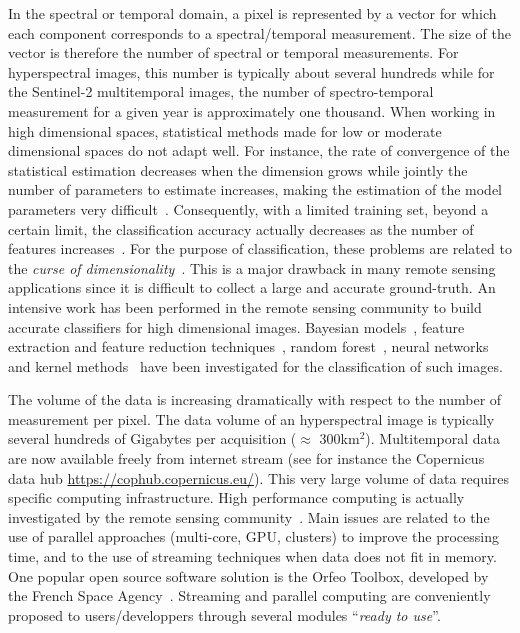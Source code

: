 \documentclass[journal,10pt]{IEEEtran}
\begin{document}
In the spectral or temporal domain, a pixel is represented by a vector
for   which  each   component  corresponds   to  a   spectral/temporal
measurement.   The size  of  the  vector is  therefore  the number  of
spectral  or temporal  measurements.  For  hyperspectral images,  this
number is  typically about several  hundreds while for  the Sentinel-2
multitemporal images, the number of spectro-temporal measurement for a
given  year  is approximately  one  thousand.   When working  in  high
dimensional  spaces,  statistical  methods  made for  low  or  moderate
dimensional  spaces do  not  adapt  well.  For  instance,  the rate  of
convergence of the statistical estimation decreases when the dimension
grows while jointly the number of parameters to estimate increases,
making    the    estimation    of   the    model    parameters    very
difficult~\cite{donoho}.  Consequently,  with a limited  training set,
beyond a certain limit, the classification accuracy actually decreases
as the number of features increases~\cite{hughes}.  For the purpose of
classification,  these  problems are  related  to  the \emph{curse  of
  dimensionality}~\cite{donoho}.  This is  a  major  drawback in  many
remote sensing  applications since it  is difficult to collect  a large
and accurate ground-truth.  An intensive work has been performed in
the remote  sensing community to  build accurate classifiers  for high
dimensional  images.   Bayesian models~\cite{book:landgrebe},  feature
extraction              and             feature              reduction
techniques~\cite{book:landgrebe,DR:guided:tour},                random
forest~\cite{1396322},   neural  networks~\cite{5411821}   and  kernel
methods~\cite{kernel:methods:rs}  have   been  investigated   for  the
classification of such images.

The volume of the data is  increasing dramatically with respect to the
number of measurement  per pixel. The data volume  of an hyperspectral
image  is  typically several  hundreds  of  Gigabytes per  acquisition
($\approx$  300km$^2$). Multitemporal  data are  now available  freely
from  internet  stream  (see  for instance  the  Copernicus  data  hub
\url{https://cophub.copernicus.eu/}).  This very  large volume of data
requires   specific   computing  infrastructure.    High   performance
computing   is   actually   investigated   by   the   remote   sensing
community~\cite{christophe2011remote,plaza2011high}.  Main  issues are
related to the use of parallel approaches (multi-core, GPU, clusters) to
improve the  processing time, and  to the use of  streaming techniques
when data  does not fit in  memory.  One popular open  source software
solution  is  the Orfeo  Toolbox,  developed  by the  French  Space
Agency~\cite{christophe2008orfeo}.   Streaming and  parallel computing
are  conveniently proposed  to  users/developpers through  several
modules ``\emph{ready to use}''.
\end{document}

